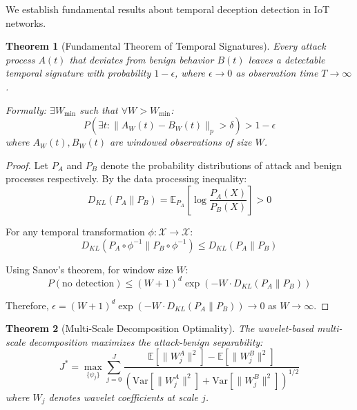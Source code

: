 \documentclass[10pt,conference]{IEEEtran}
\newtheorem{theorem}{Theorem}
\begin{document}
We establish fundamental results about temporal deception detection in IoT networks.

\begin{theorem}[Fundamental Theorem of Temporal Signatures]
\label{thm:temporal_signatures}
Every attack process $A(t)$ that deviates from benign behavior $B(t)$ leaves a detectable temporal signature with probability $1 - \epsilon$, where $\epsilon \to 0$ as observation time $T \to \infty$.

Formally: $\exists W_{\min}$ such that $\forall W > W_{\min}$:
\begin{equation}
P\left(\exists t: \|A_W(t) - B_W(t)\|_p > \delta\right) > 1 - \epsilon
\end{equation}
where $A_W(t), B_W(t)$ are windowed observations of size $W$.
\end{theorem}

\begin{proof}
Let $P_A$ and $P_B$ denote the probability distributions of attack and benign processes respectively. By the data processing inequality:
\begin{equation}
D_{KL}(P_A \| P_B) = \mathbb{E}_{P_A}\left[\log \frac{P_A(X)}{P_B(X)}\right] > 0
\end{equation}

For any temporal transformation $\phi: \mathcal{X} \to \mathcal{X}$:
\begin{equation}
D_{KL}(P_A \circ \phi^{-1} \| P_B \circ \phi^{-1}) \leq D_{KL}(P_A \| P_B)
\end{equation}

Using Sanov's theorem, for window size $W$:
\begin{equation}
P(\text{no detection}) \leq (W+1)^d \exp(-W \cdot D_{KL}(P_A \| P_B))
\end{equation}

Therefore, $\epsilon = (W+1)^d \exp(-W \cdot D_{KL}(P_A \| P_B)) \to 0$ as $W \to \infty$.
\end{proof}

\begin{theorem}[Multi-Scale Decomposition Optimality]
\label{thm:multiscale}
The wavelet-based multi-scale decomposition maximizes the attack-benign separability:
\begin{equation}
J^* = \max_{\{\psi_j\}} \sum_{j=0}^{J} \frac{\mathbb{E}[\|W_j^A\|^2] - \mathbb{E}[\|W_j^B\|^2]}{(\text{Var}[\|W_j^A\|^2] + \text{Var}[\|W_j^B\|^2])^{1/2}}
\end{equation}
where $W_j$ denotes wavelet coefficients at scale $j$.
\end{theorem}
\end{document}
